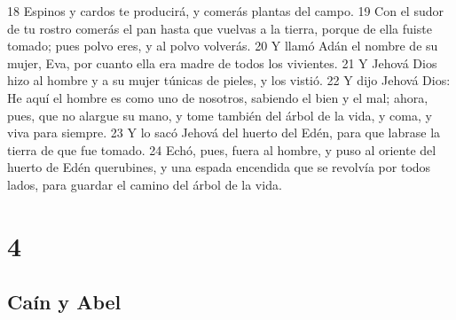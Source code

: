 18 Espinos y cardos te producirá, y comerás plantas del campo.
19 Con el sudor de tu rostro comerás el pan hasta que vuelvas a la tierra, porque de ella fuiste tomado; pues polvo eres, y al polvo volverás.
20 Y llamó Adán el nombre de su mujer, Eva, por cuanto ella era madre de todos los vivientes.
21 Y Jehová Dios hizo al hombre y a su mujer túnicas de pieles, y los vistió.
22 Y dijo Jehová Dios: He aquí el hombre es como uno de nosotros, sabiendo el bien y el mal; ahora, pues, que no alargue su mano, y tome también del árbol de la vida, y coma, y viva para siempre.
23 Y lo sacó Jehová del huerto del Edén, para que labrase la tierra de que fue tomado.
24 Echó, pues, fuera al hombre, y puso al oriente del huerto de Edén querubines, y una espada encendida que se revolvía por todos lados, para guardar el camino del árbol de la vida.

\chapter{4}

\section{Caín y Abel}

